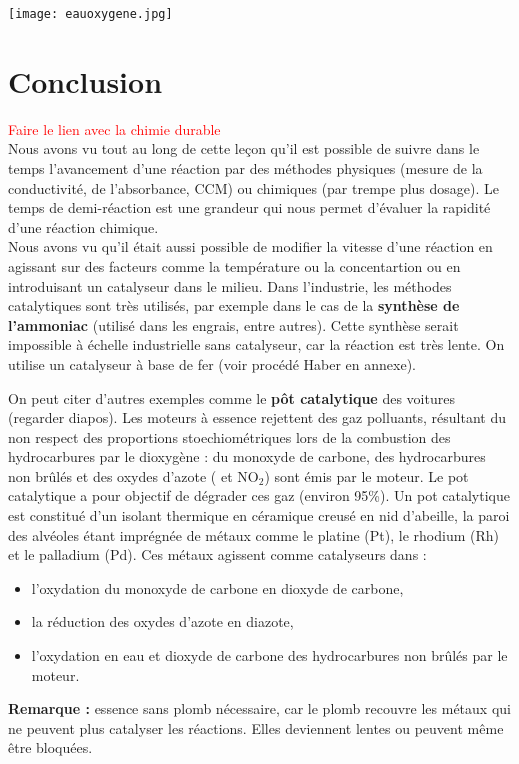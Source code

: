 \documentclass{article}
\begin{document}
\begin{center}
    \texttt{[image: eauoxygene.jpg]}
\end{center}


\section*{Conclusion}


\textcolor{red}{Faire le lien avec la chimie durable}\\

Nous avons vu tout au long de cette leçon qu'il est possible de suivre dans le temps l'avancement d'une réaction par des méthodes physiques (mesure de la conductivité, de l'absorbance, CCM) ou chimiques (par trempe plus dosage). Le temps de demi-réaction est une grandeur qui nous permet d'évaluer la rapidité d'une réaction chimique.\\

Nous avons vu qu'il était aussi possible de modifier la vitesse d'une réaction en agissant sur des facteurs comme la température ou la concentartion ou en introduisant un catalyseur dans le milieu. Dans l'industrie, les méthodes catalytiques sont très utilisés, par exemple dans le cas de la \textbf{synthèse de l'ammoniac} (utilisé dans les engrais, entre autres). Cette synthèse serait impossible à échelle industrielle sans catalyseur, car la réaction est très lente. On utilise un catalyseur à base de fer (voir procédé Haber en annexe).\medskip

On peut citer d'autres exemples comme le \textbf{pôt catalytique} des voitures (regarder diapos). Les moteurs à essence rejettent des gaz polluants, résultant du non respect des proportions 	stoechiométriques lors de la combustion des hydrocarbures par le dioxygène : du monoxyde de carbone, des hydrocarbures non brûlés et des oxydes d'azote ( et $\text{NO}_2$) sont émis par le moteur. Le pot catalytique a pour objectif de dégrader ces gaz (environ 95\%). Un pot catalytique est constitué d'un isolant thermique en céramique creusé en nid d'abeille, la paroi des alvéoles étant imprégnée de métaux comme le platine (Pt), le rhodium (Rh) et le palladium (Pd). Ces métaux agissent comme catalyseurs dans :
	\begin{itemize}
		\item l'oxydation du monoxyde de carbone en dioxyde de carbone,
		\item la réduction des oxydes d'azote en diazote,
		\item l'oxydation en eau et dioxyde de carbone des hydrocarbures non brûlés par le 						moteur.\\
	\end{itemize}
	\textbf{Remarque :} essence sans plomb nécessaire, car le plomb recouvre les métaux qui ne 		peuvent plus catalyser les réactions. Elles deviennent lentes ou peuvent même être bloquées.\\ 
\end{document}
